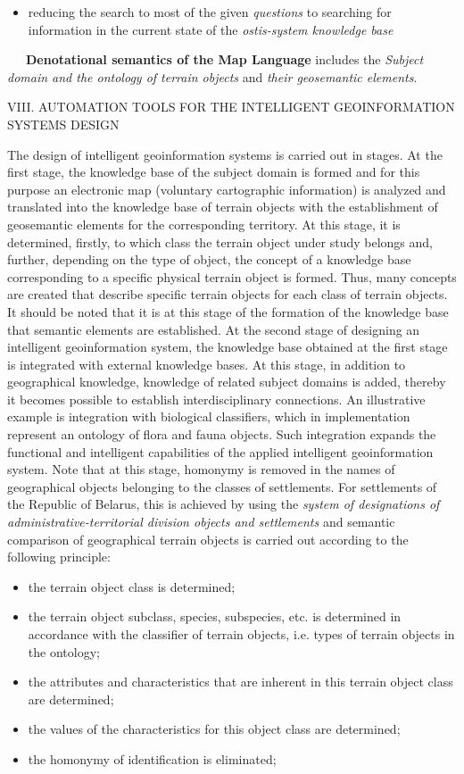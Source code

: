 \documentclass{article}
\begin{document}
\begin{multicols}{2}
\begin{itemize}
		\item  reducing the search to most of the given \textit{questions}
to searching for information in the current state of
the \textit{ostis-system knowledge base}
	\end{itemize}
\ \ \  \textbf{Denotational semantics of the Map Language} includes
the \textit{Subject domain and the ontology of terrain objects}
and \textit{their geosemantic elements}.
\begin{center}
VIII. AUTOMATION TOOLS FOR THE INTELLIGENT
GEOINFORMATION SYSTEMS DESIGN
\end{center}
The design of intelligent geoinformation systems is
carried out in stages. At the first stage, the knowledge
base of the subject domain is formed and for this purpose
an electronic map (voluntary cartographic information)
is analyzed and translated into the knowledge base of
terrain objects with the establishment of geosemantic
elements for the corresponding territory. At this stage, it
is determined, firstly, to which class the terrain object
under study belongs and, further, depending on the type
of object, the concept of a knowledge base corresponding
to a specific physical terrain object is formed. Thus, many
concepts are created that describe specific terrain objects
for each class of terrain objects. It should be noted that
it is at this stage of the formation of the knowledge base
that semantic elements are established. At the second
stage of designing an intelligent geoinformation system,
the knowledge base obtained at the first stage is integrated
with external knowledge bases. At this stage, in addition
to geographical knowledge, knowledge of related subject
domains is added, thereby it becomes possible to establish
interdisciplinary connections. An illustrative example is
integration with biological classifiers, which in implementation represent an ontology of flora and fauna objects.
Such integration expands the functional and intelligent
capabilities of the applied intelligent geoinformation
system. Note that at this stage, homonymy is removed in
the names of geographical objects belonging to the classes
of settlements. For settlements of the Republic of Belarus,
this is achieved by using the \textit{system of designations of
administrative-territorial division objects and settlements}
and semantic comparison of geographical terrain objects
is carried out according to the following principle:
\begin{itemize}
  \item the terrain object class is determined;
  \item the terrain object subclass, species, subspecies, etc.
is determined in accordance with the classifier of
terrain objects, i.e. types of terrain objects in the
ontology;
  \item the attributes and characteristics that are inherent in
this terrain object class are determined;
  \item the values of the characteristics for this object class
are determined;
  \item the homonymy of identification is eliminated;
 \end{itemize}	
\end{multicols}
\end{document}
